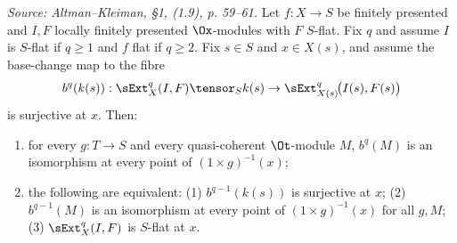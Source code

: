 \begin{theorem}
  \label{thm:exchange}
  \textit{Source: Altman--Kleiman, §1, (1.9), p. 59--61.}
  Let $f : X \to S$ be finitely presented and $I, F$ locally finitely presented
  $\Ox$-modules with $F$ $S$-flat. Fix $q$ and assume $I$ is $S$-flat if
  $q \geq 1$ and $f$ flat if $q \geq 2$. Fix $s \in S$ and $x \in X(s)$, and
  assume the base-change map to the fibre
  \[
    b^q(k(s)) : \sExt^q_X(I,F) \tensor_S k(s) \to
      \sExt^q_{X(s)}\!\big(I(s), F(s)\big)
  \]
  is surjective at $x$. Then:
  \begin{enumerate}
    \item[(i)] for every $g : T \to S$ and every quasi-coherent $\Ot$-module $M$,
      $b^q(M)$ is an isomorphism at every point of $(1\times g)^{-1}(x)$;
    \item[(ii)] the following are equivalent: \textnormal{(1)} $b^{q-1}(k(s))$ is
      surjective at $x$; \textnormal{(2)} $b^{q-1}(M)$ is an isomorphism at every
      point of $(1\times g)^{-1}(x)$ for all $g, M$; \textnormal{(3)}
      $\sExt^q_X(I,F)$ is $S$-flat at $x$.
  \end{enumerate}

\end{theorem}
